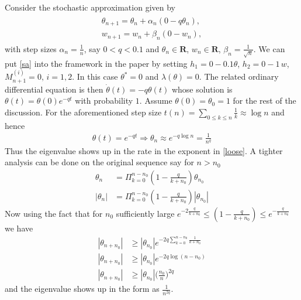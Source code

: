 \documentclass{article}
\newcommand{\R}{\mathbf{R}}
\begin{document}
 

\onecolumn
{}


\vskip 0.3in


Consider the stochastic approximation given by
\begin{align}\label{sa}
\begin{split}
\theta_{n+1}=\theta_n+\alpha_n(0 -q\theta_n),\\
w_{n+1}=w_n+\beta_n(0 -w_n),
\end{split}
\end{align}
with step sizes $\alpha_n=\frac{1}{n}$, say $0<q<0.1$ and $\theta_n\in \R$, $w_n\in \R$, $\beta_n=\frac{1}{\sqrt{n}}$. We can put \eqref{sa} into the framework in the paper by setting $h_1=0-0.1\theta$, $h_2=0-1\,w$, $M^{(i)}_{n+1}=0,\,i=1,2$. In this case $\theta^*=0$ and $\lambda(\theta)=0$. The related ordinary differential equation is then $\dot{\theta}(t)=-q\theta(t)$ whose solution is $\theta(t)=\theta(0)e^{-qt}$ with probability $1$.  Assume $\theta(0)=\theta_0=1$ for the rest of the discussion. For the aforementioned step size $t(n)=\sum_{0\leq k\leq n} \frac{1}{k}\approx \log n$ and hence
\begin{align}\label{loose}
\theta(t) =e^{-q t} \Rightarrow \theta_n \approx e^{-q \log n} = \frac{1}{n^{q}}
\end{align}
Thus the eigenvalue shows up in the rate in the exponent in \eqref{loose}. A tighter analysis can be done on the original sequence say for $n>n_0$
\begin{align*}
\theta_{n}&=\Pi_{k=0}^{n-n_0}(1-\frac{q}{k+n_0}) \theta_{n_0}\\
|\theta_{n}|&=\Pi_{k=0}^{n-n_0}(1-\frac{q}{k+n_0}) |\theta_{n_0}|
\end{align*}
Now using the fact that for $n_0$ sufficiently large $e^{-2\frac{q}{k+n_0}}\leq(1-\frac{q}{k+n_0})\leq e^{-\frac{q}{k+n_0}}$ we have
\begin{align}\label{exact}
 |\theta_{n+n_0}|&\geq |\theta_{n_0}|e^{-2q\sum_{k=0}^{n-n_0}\frac{1}{k+n_0} }\\
|\theta_{n+n_0}|&\geq |\theta_{n_0}|e^{-2q\log(n-n_0) } \\
|\theta_{n+n_0}|&\geq |\theta_{n_0}|\big(\frac{n_0}{n}\big)^{2q}
\end{align}
and the eigenvalue shows up in the form as $\frac{1}{n^{2q}}$.
\end{document}
